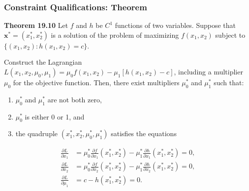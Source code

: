 \documentclass[9pt,aspectratio=169]{beamer}
\begin{document}
\begin{frame}
    \frametitle{Constraint Qualifications: Theorem}
    \begin{block}{\textbf{Theorem 19.10}}
        Let $f$ and $h$ be $C^1$ functions of two variables. Suppose that
        $\mathbf{x}^*=(x_1^*,x_2^*)$ is a solution of the problem of
        maximizing $f(x_1,x_2)$ subject to $\{(x_1,x_2):h(x_1,x_2)=c\}$.

        Construct the Lagrangian $L(x_1,x_2,\mu_0,\mu_1)
        =\mu_0f(x_1,x_2)-\mu_1[h(x_1,x_2)-c]$, including a multiplier $\mu_0$
        for the objective function. Then, there exist multipliers $\mu_0^*$
        and $\mu_1^*$ such that:
        \begin{enumerate}
            \item[(a)] $\mu_0^*$ and $\mu_1^*$ are not both zero,
            \item[(b)] $\mu_0^*$ is either 0 or 1, and
            \item[(c)] the quadruple $(x_1^*,x_2^*,\mu_0^*,\mu_1^*)$
            satisfies the equations
        \end{enumerate}
        \begin{align*}
            \frac{\partial L}{\partial x_1}
            &=\mu_0^*\frac{\partial f}{\partial x_1}(x_1^*,x_2^*)
              -\mu_1^*\frac{\partial h}{\partial x_1}(x_1^*,x_2^*)=0,\\
            \frac{\partial L}{\partial x_2}
            &=\mu_0^*\frac{\partial f}{\partial x_2}(x_1^*,x_2^*)
              -\mu_1^*\frac{\partial h}{\partial x_2}(x_1^*,x_2^*)=0,\\
            \frac{\partial L}{\partial \mu_1}
            &=c-h(x_1^*,x_2^*)=0.
        \end{align*}

    \end{block}
\end{frame}
\end{document}
